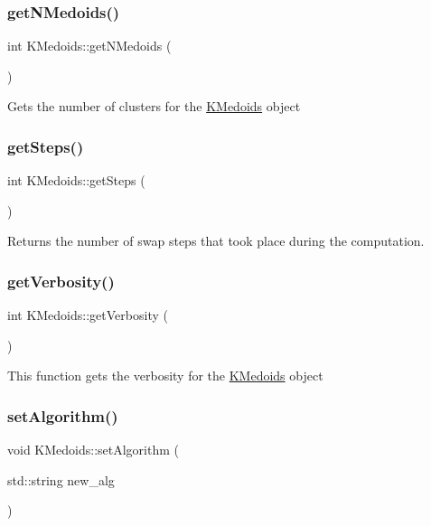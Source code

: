 \subsubsection{\texorpdfstring{get\+N\+Medoids()}{getNMedoids()}}
{\footnotesize\ttfamily int K\+Medoids\+::get\+N\+Medoids (\begin{DoxyParamCaption}{ }\end{DoxyParamCaption})}

Gets the number of clusters for the \hyperlink{classKMedoids}{K\+Medoids} object \mbox{\label{classKMedoids_a2c8d55468ebe909229ea7bcdb50e8351}} 
\subsubsection{\texorpdfstring{get\+Steps()}{getSteps()}}
{\footnotesize\ttfamily int K\+Medoids\+::get\+Steps (\begin{DoxyParamCaption}{ }\end{DoxyParamCaption})}

Returns the number of swap steps that took place during the computation. \mbox{\label{classKMedoids_a8d5372adbed828602f9311dbe9c70198}} 
\subsubsection{\texorpdfstring{get\+Verbosity()}{getVerbosity()}}
{\footnotesize\ttfamily int K\+Medoids\+::get\+Verbosity (\begin{DoxyParamCaption}{ }\end{DoxyParamCaption})}

This function gets the verbosity for the \hyperlink{classKMedoids}{K\+Medoids} object \mbox{\label{classKMedoids_a1a6dbc45f5d83bded48bf86cbc2690ad}} 
\subsubsection{\texorpdfstring{set\+Algorithm()}{setAlgorithm()}}
{\footnotesize\ttfamily void K\+Medoids\+::set\+Algorithm (\begin{DoxyParamCaption}\item[{std\+::string}]{new\+\_\+alg }\end{DoxyParamCaption})}

